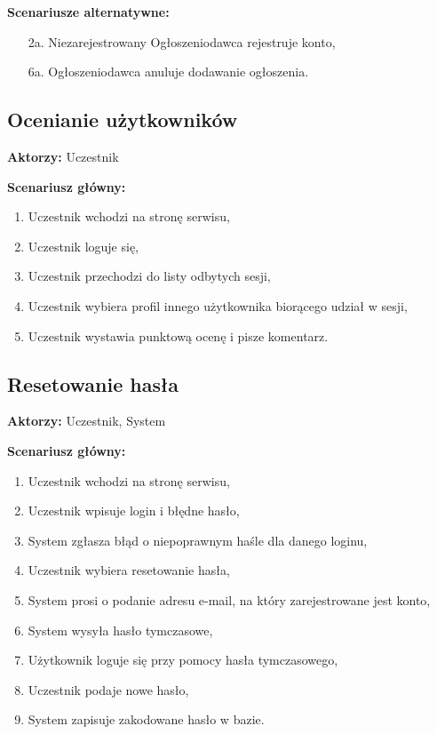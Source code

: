 \textbf{Scenariusze alternatywne:}
	\begin{enumerate}
	\item[2a.] Niezarejestrowany Ogłoszeniodawca rejestruje konto,
	\item[6a.] Ogłoszeniodawca anuluje dodawanie ogłoszenia.
	\end{enumerate}

\subsection*{Ocenianie użytkowników}

\textbf{Aktorzy:} Uczestnik

\textbf{Scenariusz główny:}
	\begin{enumerate}
	\item Uczestnik wchodzi na stronę serwisu,
	\item Uczestnik loguje się,
	\item Uczestnik przechodzi do listy odbytych sesji,
	\item Uczestnik wybiera profil innego użytkownika biorącego udział w sesji,
	\item Uczestnik wystawia punktową ocenę i pisze komentarz.
	\end{enumerate}

\subsection*{Resetowanie hasła}

\textbf{Aktorzy:} Uczestnik, System

\textbf{Scenariusz główny:}
	\begin{enumerate}
	\item Uczestnik wchodzi na stronę serwisu,
	\item Uczestnik wpisuje login i błędne hasło,
	\item System zgłasza błąd o niepoprawnym haśle dla danego loginu,
	\item Uczestnik wybiera resetowanie hasła,
	\item System prosi o podanie adresu e-mail, na który zarejestrowane jest konto,
	\item System wysyła hasło tymczasowe,
	\item Użytkownik loguje się przy pomocy hasła tymczasowego,
	\item Uczestnik podaje nowe hasło,
	\item System zapisuje zakodowane hasło w bazie.
	\end{enumerate}

